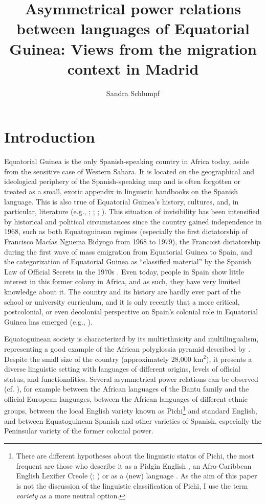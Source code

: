 \documentclass[output=paper]{langscibook}
\author{Sandra Schlumpf \orcid{0000-0001-6316-1694} \affiliation{University of Basel}}
\title[Asymmetrical power relations between languages of Equatorial Guinea]{Asymmetrical power relations between languages of Equatorial Guinea: Views from the migration context in Madrid}
\begin{document}
\maketitle

\section{Introduction}\label{schlumpf:sec:intro}
Equatorial Guinea is the only Spanish-speaking country in Africa today, aside from the sensitive case of Western Sahara. It is located on the geographical and ideological periphery of the Spanish-speaking map and is often forgotten or treated as a small, exotic appendix in linguistic handbooks on the Spanish language. This is also true of Equatorial Guinea’s history, cultures, and, in particular, literature (e.g., \citealt{mbomio_bacheng_originalidad_2011}; \citealt{trujillo_historia_2012}; \citealt{repinecz_raza_2019}; \citealt{riochi_siafa_guinea_2021}). This situation of invisibility has been intensified by historical and political circumstances since the country gained independence in 1968, such as both Equatoguinean regimes (especially the first dictatorship of Francisco Macías Nguema Bidyogo from 1968 to 1979), the Francoist dictatorship during the first wave of mass emigration from Equatorial Guinea to Spain, and the categorization of Equatorial Guinea as “classified material” by the Spanish Law of Official Secrets in the 1970s \citep[290-292]{schlumpf_construccion_2019}. Even today, people in Spain show little interest in this former colony in Africa, and as such, they have very limited knowledge about it. The country and its history are hardly ever part of the school or university curriculum, and it is only recently that a more critical, postcolonial, or even decolonial perspective on Spain’s colonial role in Equatorial Guinea has emerged (e.g., \citealt{aixela-cabre_colonial_2020}).

Equatoguinean society is characterized by its multiethnicity and multilingualism, representing a good example of the African polyglossia pyramid described by \citet[210]{wolff_language_2016}. Despite the small size of the country 
(approximately 28,000 km$^2$), it presents a diverse linguistic setting with languages of different origins, levels of official status, and functionalities. Several asymmetrical power relations can be observed (cf. \citealt{martin_rojo_language_2017}), for example between the African languages of the Bantu family and the official European languages, between the African languages of different ethnic groups, between the local English variety known as Pichi\footnote{There are different hypotheses about the linguistic status of Pichi, the most frequent are those who describe it as a Pidgin English \citep{lipski_pidgin_1992}, an Afro-Caribbean English Lexifier Creole (\citealt{yakpo_pichi_2013}; \citealt{yakpo_wayward_2013}) or as a (new) language \citep{lipski_isnt_2012}. As the aim of this paper is not the discussion of the linguistic classification of Pichi, I use the term \textit{variety} as a more neutral option.} and standard English, and between Equatoguinean Spanish and other varieties of Spanish, especially the Peninsular variety of the former colonial power.
\end{document}
